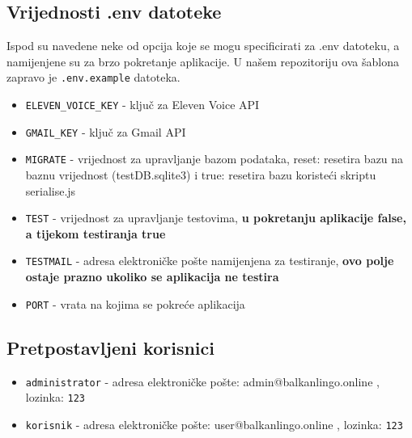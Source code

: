 		\subsection*{Vrijednosti .env datoteke}
			Ispod su navedene neke od opcija koje se mogu specificirati za .env datoteku, a namijenjene su za brzo pokretanje aplikacije. U našem repozitoriju ova šablona zapravo je \texttt{.env.example} datoteka.
			\begin{itemize}
				\item \texttt{ELEVEN\_VOICE\_KEY} - ključ za Eleven Voice API
				\item \texttt{GMAIL\_KEY} - ključ za Gmail API
				\item \texttt{MIGRATE} - vrijednost za upravljanje bazom podataka, reset: resetira bazu na baznu vrijednost (testDB.sqlite3) i true: resetira bazu koristeći skriptu serialise.js
				\item \texttt{TEST} - vrijednost za upravljanje testovima, \textbf{u pokretanju aplikacije false, a tijekom testiranja true}
				\item \texttt{TESTMAIL} - adresa elektroničke pošte namijenjena za testiranje, \textbf{ovo polje ostaje prazno ukoliko se aplikacija ne testira}
				\item \texttt{PORT} - vrata na kojima se pokreće aplikacija
			\end{itemize}
		
		\subsection*{Pretpostavljeni korisnici}
			\begin{itemize}
				\item \texttt{administrator} - adresa elektroničke pošte: admin@balkanlingo.online , lozinka: \texttt{123} 
				\item \texttt{korisnik} - adresa elektroničke pošte: user@balkanlingo.online , lozinka: \texttt{123}
			\end{itemize}
			
		\eject
